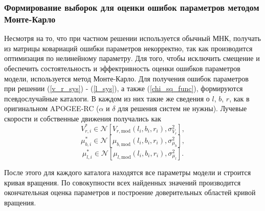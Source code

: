 \documentclass{matmex-diploma-custom}
\begin{document}
\subsubsection{Формирование выборок для оценки ошибок параметров методом \\ Монте-Карло} \label{mk}
Несмотря на то, что при частном решении используется обычный МНК, получать из матрицы ковариаций ошибки параметров некорректно, так как производится оптимизация по нелинейному параметру. Для того, чтобы исключить смещение и обеспечить состоятельность и эффектривность оценки ошибков параметров модели, используется метод Монте-Карло. Для получения ошибок параметров при решении (\ref{v_r_sys}) - (\ref{l_sys}), а также (\ref{chi_sq_func}), формируются псевдослучайные каталоги. В каждом из них такие же сведения о $l$, $b$, $r$, как в оригинальном APOGEE-RC ($\alpha$ и $\delta$ для решения систем не нужны). Лучевые скорости и собственные движения получались как
\begin{equation}
        V_{r, i}^{*} \in \mathcal{N} \left[ V_{r, \mathrm{mod}}(l_i, b_i, r_i),\sigma^2_{V_r} \right],
\end{equation}
\begin{equation}
        \mu_{b, i}^{*} \in \mathcal{N} \left[ \mu_{b, \mathrm{mod}}(l_i, b_i, r_i),\sigma^2_{\mu_b} \right],
\end{equation}
\begin{equation}
        \mu_{l, i}^{*} \in \mathcal{N} \left[ \mu_{l, \mathrm{mod}}(l_i, b_i, r_i),\sigma^2_{\mu_l} \right].
\end{equation}
\par После этого для каждого каталога находятся все параметры модели и строится кривая вращения. По совокупности всех найденных значений производится окончательная оценка параметров и построение доверительных областей кривой вращения.
\pagebreak
\end{document}
